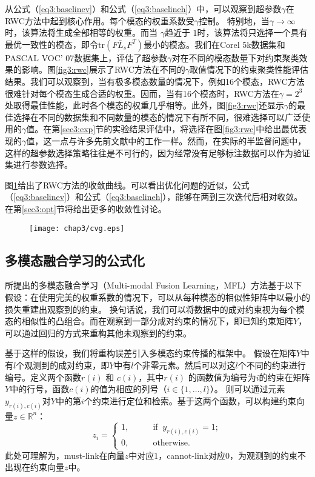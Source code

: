 从公式（\ref{eq3:baselinev}）和公式（\ref{eq3:baselineh}）中，可以观察到超参数$ \gamma $在RWC方法中起到核心作用。每个模态的权重系数受$ \gamma $控制。 特别地，当$ \gamma \rightarrow \infty$时，该算法将生成全部相等的权重。而当 $ \gamma $趋近于 $ 1 $时，该算法将只选择一个具有最优一致性的模态，即令$  \mathrm{tr}({F} \bar{{L}}_s{F}^T) $最小的模态。我们在Corel 5k数据集和PASCAL VOC' 07数据集上，评估了超参数$\gamma$对在不同的模态数量下对约束聚类效果的影响。图\ref{fig3:rwc}展示了RWC方法在不同的$\gamma$取值情况下的约束聚类性能评估结果。我们可以观察到，当有极多模态数量的情况下，例如16个模态，RWC方法很难针对每个模态生成合适的权重。因而，当有16个模态时，RWC方法在$ \gamma = 2^3 $处取得最佳性能，此时各个模态的权重几乎相等。此外，图\ref{fig3:rwc}还显示$\gamma$的最佳选择在不同的数据集和不同数量的模态的情况下有所不同，很难选择可以广泛使用的$\gamma$值。在第\ref{sec3:exp}节的实验结果评估中，将选择在图\ref{fig3:rwc}中给出最优表现的$ \gamma $值，这一点与许多先前文献中的工作一样。然而，在实际的半监督问题中，这样的超参数选择策略往往是不可行的，因为经常没有足够标注数据可以作为验证集进行参数选择。

图\ref{fig3:cvg}给出了RWC方法的收敛曲线。可以看出优化问题的近似，公式（\ref{eq3:baselinev}）和公式（\ref{eq3:baselineh}），能够在两到三次迭代后相对收敛。在第\ref{sec3:opt}节将给出更多的收敛性讨论。

\begin{figure}[t]
	\centering
	\texttt{[image: chap3/cvg.eps]}
	\label{fig3:cvg}
\end{figure}

\subsection{多模态融合学习的公式化}
所提出的多模态融合学习（Multi-modal Fusion Learning，MFL）方法基于以下假设：在使用完美的权重系数的情况下，可以从每种模态的相似性矩阵中以最小的损失重建出观察到的约束。 换句话说，我们可以将数据中的成对约束视为每个模态的相似性的凸组合。而在观察到一部分成对约束的情况下，即已知约束矩阵$Y$，可以通过回归的方式来重构其他未观察到的约束。

基于这样的假设，我们将重构误差引入多模态约束传播的框架中。
假设在矩阵$Y$中有$l$个观测到的成对约束，即$Y$中有$l$个非零元素。然后可以对这$l$个不同的约束进行编号。定义两个函数$ r(i) $ 和 $ c(i) $，其中$ r(i) $ 的函数值为编号为$i$的约束在矩阵$Y$中的行号，函数$ c(i) $的值为相应的列号（$i \in \{1,\dots,l\}$）。
则可以通过元素$ y_{r(i),c(i)} $对$Y$中的第$i$个约束进行定位和检索。基于这两个函数，可以构建约束向量$ {z} \in \mathbb{R}^n$：
\begin{equation}
z_i = \begin{cases}1,\quad\quad &\text{if}\;\; y_{r(i),c(i)} =1; \\
0, \quad\quad &\text{otherwise}.
\end{cases}
\end{equation} 
此处可理解为，must-link在向量$z$中对应$1$，cannot-link对应$0$，为观测到的约束不出现在约束向量$z$中。


